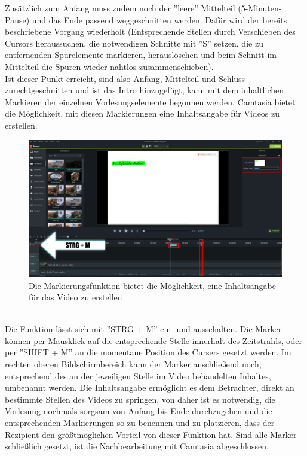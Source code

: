 \documentclass{scrreprt}
\begin{document}
Zusätzlich zum Anfang muss zudem noch der ''leere'' Mittelteil (5-Minuten-Pause) und das Ende passend weggeschnitten werden. Dafür wird der bereits beschriebene Vorgang wiederholt (Entsprechende Stellen durch Verschieben des Cursors heraussuchen, die notwendigen Schnitte mit ''S'' setzen, die zu entfernenden Spurelemente markieren, herauslöschen und beim Schnitt im Mittelteil die Spuren wieder nahtlos zusammenschieben).\\
Ist dieser Punkt erreicht, sind also Anfang, Mittelteil und Schluss zurechtgeschnitten und ist das Intro hinzugefügt, kann mit dem inhaltlichen Markieren der einzelnen Vorlesungselemente begonnen werden. Camtasia bietet die Möglichkeit, mit diesen Markierungen eine Inhaltsangabe für Videos zu erstellen. 
\\
\begin{figure}[h]
    \centering
    \includegraphics[width=1\textwidth]{markierungen.png}
    \caption{Die Markierungsfunktion bietet die Möglichkeit, eine Inhaltsangabe für das Video zu erstellen}
    \label{fig:markierungen}
\end{figure}
\pagebreak
\noindent
\\
Die Funktion lässt sich mit ''STRG + M'' ein- und ausschalten. Die Marker können per Mausklick auf die entsprechende Stelle innerhalt des Zeitstrahls, oder per ''SHIFT + M'' an die momentane Position des Cursers gesetzt werden. Im rechten oberen Bildschirmbereich kann der Marker anschließend noch, entsprechend des an der jeweiligen Stelle im Video behandelten Inhaltes, umbenannt werden. Die Inhaltsangabe ermöglicht es dem Betrachter, direkt an bestimmte Stellen des Videos zu springen, von daher ist es notwendig, die Vorlesung nochmals sorgsam von Anfang bis Ende durchzugehen und die entsprechenden Markierungen so zu benennen und zu platzieren, dass der Rezipient den größtmöglichen Vorteil von dieser Funktion hat. Sind alle Marker schließlich gesetzt, ist die Nachbearbeitung mit Camtasia abgeschlossen.
\end{document}
